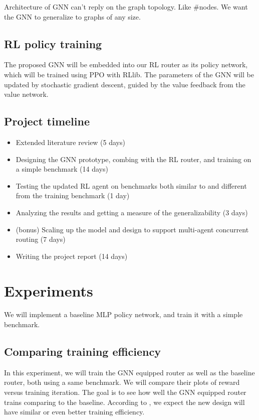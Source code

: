 \documentclass[letterpaper]{article}
\begin{document}
Architecture of GNN can't reply on the graph topology. Like \#nodes. We want the GNN to generalize to graphs of any size. 

\subsection{RL policy training}
The proposed GNN will be embedded into our RL router as its policy network, which will be trained using PPO with RLlib. The parameters of the GNN will be updated by stochastic gradient descent, guided by the value feedback from the value network. 


\subsection{Project timeline}
\begin{itemize}
    \item Extended literature review (5 days)
    \item Designing the GNN prototype, combing with the RL router, and training on a simple benchmark (14 days)
    \item Testing the updated RL agent on benchmarks both similar to and different from the training benchmark (1 day)
    \item Analyzing the results and getting a measure of the generalizability (3 days)
    \item (bonus) Scaling up the model and design to support multi-agent concurrent routing (7 days)
    \item Writing the project report (14 days)
\end{itemize}
    
\section{Experiments}
We will implement a baseline MLP policy network, and train it with a simple benchmark.

\subsection{Comparing training efficiency}
In this experiment, we will train the GNN equipped router as well as the baseline router, both using a same benchmark. We will compare their plots of reward versus training iteration. The goal is to see how well the GNN equipped router trains comparing to the baseline. According to \cite{Wang2018}, we expect the new design will have similar or even better training efficiency.
\end{document}
